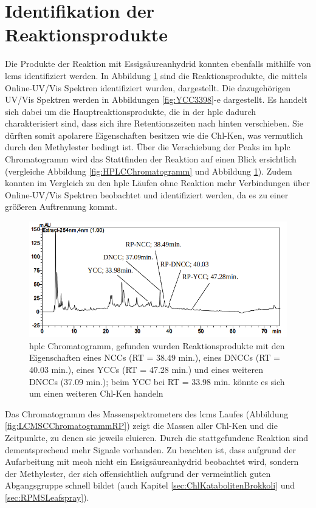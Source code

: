 \pagebreak
\section{Identifikation der Reaktionsprodukte}

Die Produkte der Reaktion mit Essigsäureanhydrid konnten ebenfalls mithilfe von \gls{lcms} identifiziert werden. In Abbildung \ref{fig:HPLCChromatogrammRP} sind die Reaktionsprodukte, die mittels Online-UV/Vis Spektren identifiziert wurden, dargestellt. Die dazugehörigen UV/Vis Spektren werden in Abbildungen \ref{fig:YCC3398}-e dargestellt. Es handelt sich dabei um die Hauptreaktionsprodukte, die in der \gls{hplc} dadurch charakterisiert sind, dass sich ihre Retentionszeiten nach hinten verschieben. Sie dürften somit apolarere Eigenschaften besitzen wie die \gls{Chl-K}en, was vermutlich durch den Methylester bedingt ist. Über die Verschiebung der Peaks im \gls{hplc} Chromatogramm wird das Stattfinden der Reaktion auf einen Blick ersichtlich (vergleiche Abbildung \ref{fig:HPLCChromatogramm} und Abbildung \ref{fig:HPLCChromatogrammRP}). Zudem konnten im Vergleich zu den \gls{hplc} Läufen ohne Reaktion mehr Verbindungen über Online-UV/Vis Spektren beobachtet und identifiziert werden, da es zu einer größeren Auftrennung kommt.

\begin{figure}[!htbp]
  \includegraphics[width=\textwidth]{figures/Kapitel6/Reaktion3h/HPLC_Chromatogramm.png}
  \caption[HPLC Chromatogramm nach 3 h Reaktionsdauer, Quelle: Autor]{\gls{hplc} Chromatogramm, gefunden wurden Reaktionsprodukte mit den Eigenschaften eines NCCs (RT = 38.49 min.), eines DNCCs (RT = 40.03 min.), eines YCCs (RT = 47.28 min.) und eines weiteren DNCCs (37.09 min.); beim YCC bei RT = 33.98 min. könnte es sich um einen weiteren \gls{Chl-K}en handeln}
  \label{fig:HPLCChromatogrammRP}
\end{figure}

Das Chromatogramm des Massenspektrometers des \gls{lcms} Laufes (Abbildung \ref{fig:LCMSCChromatogrammRP}) zeigt die Massen aller \gls{Chl-K}en und die Zeitpunkte, zu denen sie jeweils eluieren. Durch die stattgefundene Reaktion sind dementsprechend mehr Signale vorhanden. Zu beachten ist, dass aufgrund der Aufarbeitung mit \gls{meoh} nicht ein Essigsäureanhydrid beobachtet wird, sondern der Methylester, der sich offensichtlich aufgrund der vermeintlich guten Abgangsgruppe  schnell bildet (auch Kapitel \ref{sec:ChlKatabolitenBrokkoli} und \ref{sec:RPMSLeafspray}). \\

